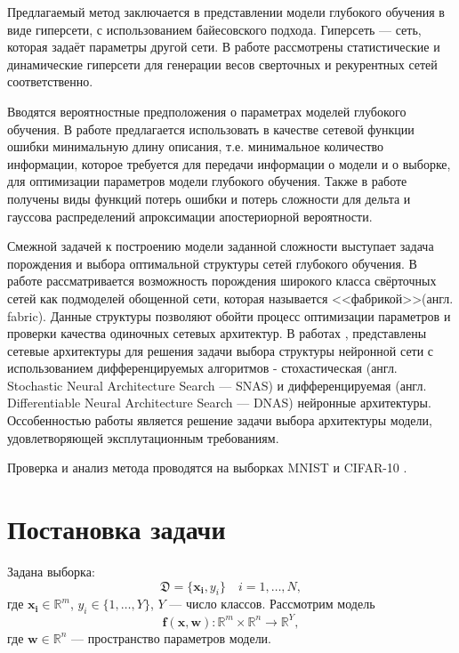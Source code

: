 \documentclass[12pt, twoside]{article}
\begin{document}
Предлагаемый метод заключается в представлении модели глубокого обучения в виде гиперсети, с использованием байесовского подхода. Гиперсеть --- сеть, которая задаёт параметры другой сети. В работе \cite{journals/corr/HaDL16} рассмотрены  статистические и динамические гиперсети для генерации весов сверточных и рекурентных сетей соответственно. 

Вводятся вероятностные предположения о параметрах моделей глубокого обучения. В работе \cite{conf/nips/Graves11} предлагается использовать в качестве сетевой функции ошибки минимальную длину описания, т.е. минимальное количество информации, которое требуется для передачи информации о модели и о выборке, для оптимизации параметров модели глубокого обучения. Также в работе \cite{conf/nips/Graves11} получены виды функций потерь ошибки и потерь сложности для дельта и гауссова распределений апроксимации апостериорной вероятности. 


Смежной задачей к построению модели заданной сложности выступает задача порождения и выбора оптимальной структуры сетей глубокого обучения. В работе \cite{journals/corr/SaxenaV16} рассматривается возможность порождения широкого класса свёрточных сетей как подмоделей обощенной сети, которая называется <<фабрикой>>(англ. fabric). Данные структуры позволяют обойти процесс оптимизации параметров и проверки качества одиночных сетевых архитектур. В работах \cite{journals/corr/abs-1812-09926}, \cite{journals/corr/abs-1812-03443} представлены сетевые архитектуры для решения задачи выбора структуры нейронной сети с использованием дифференцируемых алгоритмов - стохастическая (англ. Stochastic Neural Architecture Search --- SNAS) и дифференцируемая (англ. Differentiable Neural Architecture Search --- DNAS) нейронные архитектуры. Оссобенностью работы \cite{journals/corr/abs-1812-03443} является решение задачи выбора архитектуры модели, удовлетворяющей эксплутационным требованиям.

Проверка и анализ метода проводятся на выборках MNIST \cite{lecun-mnisthandwrittendigit-2010} и CIFAR-10 \cite{cif}. 

\section{Постановка задачи}

Задана выборка:
\[\mathfrak{D} = \{ \mathbf{x_{i}}, y_i\} \quad i = 1,\dots, N, \]
где $\mathbf{x_i} \in \mathbb{R}^m$, $y_i \in \{1,\dots,Y\} $, $Y$ --- число классов. Рассмотрим модель \[\mathbf{f}(\mathbf{x},\mathbf{w}):\mathbb{R}^m \times \mathbb{R}^n \longrightarrow \mathbb{R}^Y,\]
где $\mathbf{w} \in \mathbb{R}^n$ --- пространство параметров модели.
\end{document}
